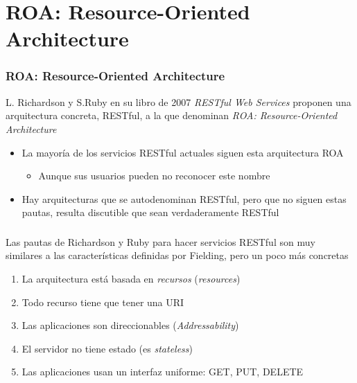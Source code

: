 \documentclass[ucs]{beamer}
\begin{document}
\section{ROA: Resource-Oriented Architecture}
\begin{frame}[fragile]
\frametitle{ROA: Resource-Oriented Architecture}
L. Richardson y S.Ruby en su libro de 2007 \emph{RESTful Web Services}
proponen una arquitectura concreta,  RESTful, a la que denominan
\emph{ROA: Resource-Oriented Architecture}

\begin{itemize}
\item
La mayoría de los servicios RESTful actuales siguen esta arquitectura ROA
\begin{itemize}
\item
Aunque sus usuarios pueden no reconocer este nombre
\end{itemize}
\item
Hay arquitecturas que se autodenominan RESTful, pero que no siguen estas
pautas, resulta discutible que sean verdaderamente RESTful
\end{itemize}

\end{frame}



\begin{frame}[fragile]
\frametitle{}
Las pautas de Richardson y Ruby para hacer servicios RESTful son muy similares
a las características definidas por Fielding, pero un poco más concretas
\begin{enumerate}
\item
La arquitectura está basada en \emph{recursos} (\emph{resources})
\item
Todo recurso tiene que tener una URI
\item
Las  aplicaciones son direccionables  (\emph{Addressability})
\item
El servidor no tiene estado (es \emph{stateless})
\item
Las aplicaciones usan un interfaz uniforme: GET, PUT, DELETE

\end{enumerate}

\end{frame}
\end{document}
